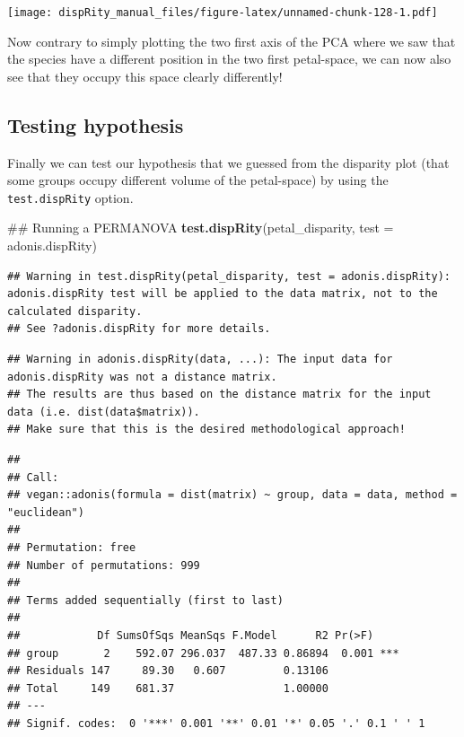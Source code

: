 \documentclass[]{book}
\newenvironment{Shaded}{\begin{snugshade}}{\end{snugshade}}
\newcommand{\KeywordTok}[1]{\textcolor[rgb]{0.13,0.29,0.53}{\textbf{#1}}}
\newcommand{\DataTypeTok}[1]{\textcolor[rgb]{0.13,0.29,0.53}{#1}}
\newcommand{\NormalTok}[1]{#1}
\theoremstyle{definition}
\theoremstyle{definition}
\theoremstyle{definition}
\theoremstyle{remark}
\begin{document}
\texttt{[image: dispRity\_manual\_files/figure-latex/unnamed-chunk-128-1.pdf]}

Now contrary to simply plotting the two first axis of the PCA where we
saw that the species have a different position in the two first
petal-space, we can now also see that they occupy this space clearly
differently!

\subsection{Testing hypothesis}\label{testing-hypothesis}

Finally we can test our hypothesis that we guessed from the disparity
plot (that some groups occupy different volume of the petal-space) by
using the \texttt{test.dispRity} option.

\begin{Shaded}
\begin{Highlighting}[]
\NormalTok{## Running a PERMANOVA}
\KeywordTok{test.dispRity}\NormalTok{(petal_disparity, }\DataTypeTok{test =}\NormalTok{ adonis.dispRity)}
\end{Highlighting}
\end{Shaded}

\begin{verbatim}
## Warning in test.dispRity(petal_disparity, test = adonis.dispRity): adonis.dispRity test will be applied to the data matrix, not to the calculated disparity.
## See ?adonis.dispRity for more details.
\end{verbatim}

\begin{verbatim}
## Warning in adonis.dispRity(data, ...): The input data for adonis.dispRity was not a distance matrix.
## The results are thus based on the distance matrix for the input data (i.e. dist(data$matrix)).
## Make sure that this is the desired methodological approach!
\end{verbatim}

\begin{verbatim}
## 
## Call:
## vegan::adonis(formula = dist(matrix) ~ group, data = data, method = "euclidean") 
## 
## Permutation: free
## Number of permutations: 999
## 
## Terms added sequentially (first to last)
## 
##            Df SumsOfSqs MeanSqs F.Model      R2 Pr(>F)    
## group       2    592.07 296.037  487.33 0.86894  0.001 ***
## Residuals 147     89.30   0.607         0.13106           
## Total     149    681.37                 1.00000           
## ---
## Signif. codes:  0 '***' 0.001 '**' 0.01 '*' 0.05 '.' 0.1 ' ' 1
\end{verbatim}
\end{document}
